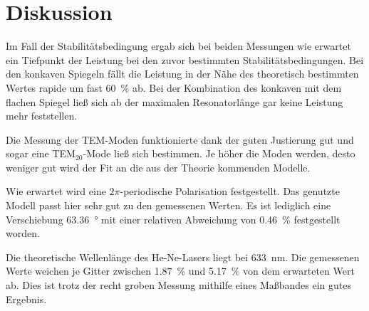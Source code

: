 \section{Diskussion}
\label{sec:Diskussion}

Im Fall der Stabilitätsbedingung ergab sich bei beiden Messungen wie erwartet ein Tiefpunkt der Leistung bei den zuvor bestimmten Stabilitätsbedingungen. 
Bei den konkaven Spiegeln fällt die Leistung in der Nähe des theoretisch bestimmten Wertes rapide um fast \SI{60}{\percent} ab.
Bei der Kombination des konkaven mit dem flachen Spiegel ließ sich ab der maximalen Resonatorlänge gar keine Leistung mehr feststellen. 

Die Messung der TEM-Moden funktionierte dank der guten Justierung gut und sogar eine TEM$_{20}$-Mode ließ sich bestimmen. 
Je höher die Moden werden, desto weniger gut wird der Fit an die aus der Theorie kommenden Modelle.

Wie erwartet wird eine $2\pi$-periodische Polarisation festgestellt. Das genutzte Modell passt hier sehr gut zu den gemessenen Werten. 
Es ist lediglich eine Verschiebung \SI{63.36}{\degree} mit einer relativen Abweichung von \SI{0.46}{\percent} festgestellt worden. 

Die theoretische Wellenlänge des He-Ne-Lasers liegt bei \SI{633}{\nano\meter}. Die gemessenen Werte weichen je Gitter zwischen \SI{1.87}{\percent} und \SI{5.17}{\percent} von dem erwarteten Wert ab. Dies ist trotz der recht groben Messung mithilfe eines Maßbandes ein gutes Ergebnis. 